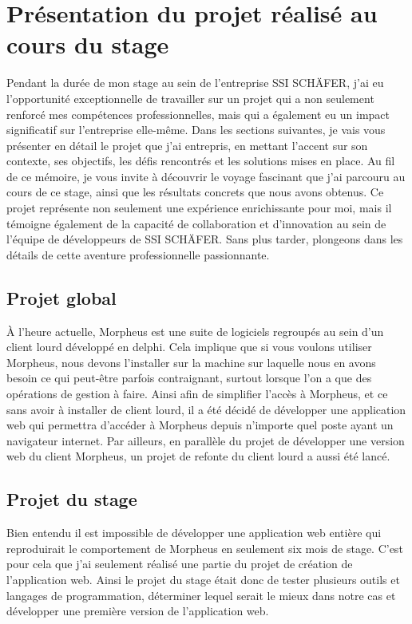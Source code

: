 \documentclass[a4paper, 12pt, french]{article}
\begin{document}
	\section{Présentation du projet réalisé au cours du stage}%
		Pendant la durée de mon stage au sein de l'entreprise SSI SCHÄFER, j'ai eu l'opportunité exceptionnelle de travailler sur un projet qui a non seulement renforcé mes compétences professionnelles, mais qui a également eu un impact significatif sur l'entreprise elle-même. Dans les sections suivantes, je vais vous présenter en détail le projet que j'ai entrepris, en mettant l'accent sur son contexte, ses objectifs, les défis rencontrés et les solutions mises en place. Au fil de ce mémoire, je vous invite à découvrir le voyage fascinant que j'ai parcouru au cours de ce stage, ainsi que les résultats concrets que nous avons obtenus. Ce projet représente non seulement une expérience enrichissante pour moi, mais il témoigne également de la capacité de collaboration et d'innovation au sein de l'équipe de développeurs de SSI SCHÄFER. Sans plus tarder, plongeons dans les détails de cette aventure professionnelle passionnante.
		
		\subsection{Projet global}
			À l'heure actuelle, Morpheus est une suite de logiciels regroupés au sein d'un client lourd développé en delphi. Cela implique que si vous voulons utiliser Morpheus, nous devons l'installer sur la machine sur laquelle nous en avons besoin ce qui peut-être parfois contraignant, surtout lorsque l'on a que des opérations de gestion à faire. Ainsi afin de simplifier l'accès à Morpheus, et ce sans avoir à installer de client lourd, il a été décidé de développer une application web qui permettra d'accéder à Morpheus depuis n'importe quel poste ayant un navigateur internet. Par ailleurs, en parallèle du projet de développer une version web du client Morpheus, un projet de refonte du client lourd a aussi été lancé. %

		\subsection{Projet du stage}
			Bien entendu il est impossible de développer une application web entière qui reproduirait le comportement de Morpheus en seulement six mois de stage. C'est pour cela que j'ai seulement réalisé une partie du projet de création de l'application web. Ainsi le projet du stage était donc de tester plusieurs outils et langages de programmation, déterminer lequel serait le mieux dans notre cas et développer une première version de l'application web.
\end{document}
